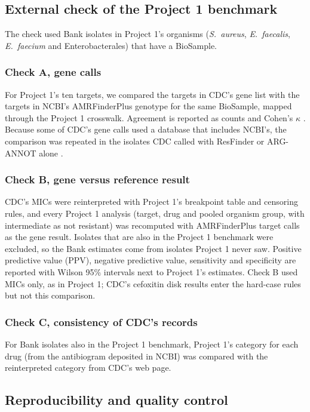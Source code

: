 \documentclass[10pt,twocolumn,letterpaper]{article}
\newcommand{\sau}{\textit{S.~aureus}}
\begin{document}
\subsection{External check of the Project 1 benchmark}

The check used Bank isolates in Project 1's organisms (\sau{}, \textit{E.~faecalis}, \textit{E.~faecium} and
Enterobacterales) that have a BioSample.

\subsubsection{Check A, gene calls}
For Project 1's ten targets, we compared the targets in CDC's gene list with the targets in NCBI's AMRFinderPlus
genotype for the same BioSample, mapped through the Project 1 crosswalk. Agreement is reported as counts and Cohen's
$\kappa$ \cite{cohen1960}. Because some of CDC's gene calls used a database that includes NCBI's, the comparison was
repeated in the isolates CDC called with ResFinder or ARG-ANNOT alone \cite{zankari2012,gupta2014}.

\subsubsection{Check B, gene versus reference result}
CDC's MICs were reinterpreted with Project 1's breakpoint table and censoring rules, and every Project 1 analysis (target,
drug and pooled organism group, with intermediate as not resistant) was recomputed with AMRFinderPlus target calls as the
gene result. Isolates that are also in the Project 1 benchmark were excluded, so the Bank estimates come from isolates
Project 1 never saw. Positive predictive value (PPV), negative predictive value, sensitivity and specificity are reported
with Wilson 95\% intervals \cite{wilson1927} next to Project 1's estimates. Check B used MICs only, as in Project 1; CDC's
cefoxitin disk results enter the hard-case rules but not this comparison.

\subsubsection{Check C, consistency of CDC's records}
For Bank isolates also in the Project 1 benchmark, Project 1's category for each drug (from the antibiogram deposited in
NCBI) was compared with the reinterpreted category from CDC's web page.

\subsection{Reproducibility and quality control}
\end{document}
